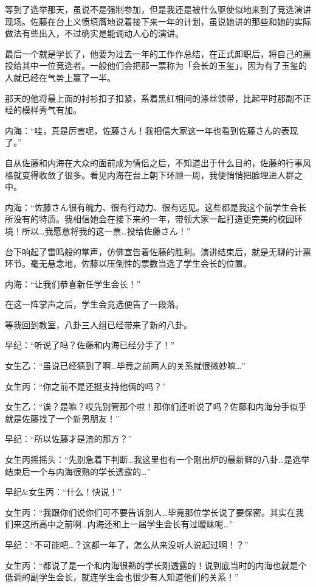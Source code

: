等到了选举那天，虽说不是强制参加，但是我还是被什么驱使似地来到了竞选演讲现场。佐藤在台上义愤填膺地说着接下来一年的计划，虽说她讲的那些和她的实际做法有些出入，不过确实是能调动人心的演讲。

最后一个就是学长了，他要为过去一年的工作作总结，在正式卸职后，将自己的票投给其中一位竞选者。一般他们会把那一票称为「会长的玉玺」，因为有了玉玺的人就已经在气势上赢了一半。

那天的他将最上面的衬衫扣子扣紧，系着黑红相间的涤丝领带，比起平时那副不正经的模样秀气有加。



内海：“哇，真是厉害呢，佐藤さん！我相信大家这一年也看到佐藤さん的表现了。”
\hypertarget{tie_boy}{}

自从佐藤和内海在大众的面前成为情侣之后，不知道出于什么目的，佐藤的行事风格就变得收敛了很多。看见内海在台上朝下环顾一周，我便悄悄把脸埋进人群之中。

内海：“佐藤さん很有魄力、很有行动力、很有远见。这些都是我这个前学生会长所没有的特质。我相信她会在接下来的一年，带领大家一起打造更完美的校园环境！所以…我愿意将我的这一票…投给佐藤さん！”

台下响起了雷鸣般的掌声，仿佛宣告着佐藤的胜利。演讲结束后，就是无聊的计票环节。毫无悬念地，佐藤以压倒性的票数当选了学生会长的位置。

内海：“让我们恭喜新任学生会长！”

在这一阵掌声之后，学生会竞选便告了一段落。

等我回到教室，八卦三人组已经带来了新的八卦。

早纪：“听说了吗？佐藤和内海已经分手了！”

女生乙：“虽说已经猜到了啊…毕竟之前两人的关系就很微妙嘛…”

女生丙：“你之前不是还挺支持他俩的吗？”

女生乙：“诶？是嘛？哎先别管那个啦！那你们还听说了吗？佐藤和内海分手似乎就是佐藤找了一个新男朋友！”

早纪：“所以佐藤才是渣的那方？”

女生丙摇摇头：“先别急着下判断…我这里也有一个刚出炉的最新鲜的八卦…是选举结束后一个与内海很熟的学长透露的…”

早纪$\&$女生丙：“什么！快说！”

女生丙：“我跟你们说你们可不要告诉别人…毕竟那位学长说了要保密。其实在我们来这所高中之前啊…内海还和上一届学生会长有过暧昧呢…”

早纪：“不可能吧…？这都一年了，怎么从来没听人说起过啊！？”

女生丙：“都说了是一个和内海很熟的学长刚透露的！说到底当时的内海也就是个低调的副学生会长，就连学生会也很少有人知道他们的关系！”

